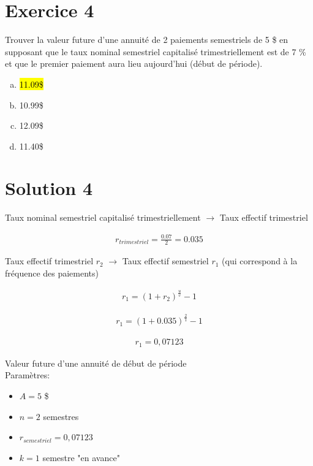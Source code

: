 \documentclass[10pt,a4paper]{article}
\begin{document}
\newpage



\section*{Exercice 4}
Trouver la valeur future d’une annuité de 2 paiements semestriels de 5 \$ en supposant que le taux nominal semestriel capitalisé trimestriellement est de 7 \% et que le premier paiement aura lieu aujourd'hui (début de période).

\begin{enumerate}[a)]
\item \hl{11.09\$}
\item 10.99\$
\item 12.09\$
\item 11.40\$
\end{enumerate}

\section*{Solution 4}

Taux nominal semestriel capitalisé trimestriellement $\rightarrow$ Taux effectif trimestriel

\begin{align*}
r_{trimestriel} = \frac{0.07}{2} = 0.035
\end{align*}

Taux effectif trimestriel $r_2$ $\rightarrow$ Taux effectif semestriel $r_1$ (qui correspond à la fréquence des paiements)

\begin{align*}
r_1 = (1+r_2)^{\frac{u}{v}} -1
\end{align*}

\begin{align*}
r_1 = (1+0.035)^{\frac{2}{1}} -1
\end{align*}

\begin{align*}
r_1 = 0,07123
\end{align*}

Valeur future d'une annuité de début de période\\

Paramètres:
\begin{itemize}
\item $A = 5$ \$
\item $n = 2$ semestres
\item $r_{semestriel}=0,07123$
\item $k=1$ semestre "en avance"
\end{itemize} 
\end{document}
